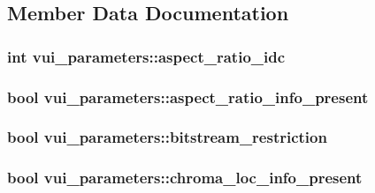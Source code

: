 \subsection{Member Data Documentation}
\hypertarget{structvui__parameters_a9f8d3a76c12d36fdb97253002462c9f6}{
\subsubsection[{aspect\_\-ratio\_\-idc}]{\setlength{\rightskip}{0pt plus 5cm}int {\bf vui\_\-parameters::aspect\_\-ratio\_\-idc}}}
\label{structvui__parameters_a9f8d3a76c12d36fdb97253002462c9f6}
\hypertarget{structvui__parameters_a71bd736f2550004929a5d27b1a63b836}{
\subsubsection[{aspect\_\-ratio\_\-info\_\-present}]{\setlength{\rightskip}{0pt plus 5cm}bool {\bf vui\_\-parameters::aspect\_\-ratio\_\-info\_\-present}}}
\label{structvui__parameters_a71bd736f2550004929a5d27b1a63b836}
\hypertarget{structvui__parameters_a9133c7d27732fe749c2696754126a9df}{
\subsubsection[{bitstream\_\-restriction}]{\setlength{\rightskip}{0pt plus 5cm}bool {\bf vui\_\-parameters::bitstream\_\-restriction}}}
\label{structvui__parameters_a9133c7d27732fe749c2696754126a9df}
\hypertarget{structvui__parameters_a784d2f7efb44e8bbfc9f66c3a60c3375}{
\subsubsection[{chroma\_\-loc\_\-info\_\-present}]{\setlength{\rightskip}{0pt plus 5cm}bool {\bf vui\_\-parameters::chroma\_\-loc\_\-info\_\-present}}}
